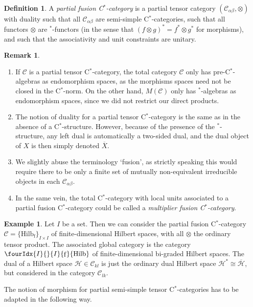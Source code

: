 \documentclass[11pt]{article}
\DeclareMathOperator{\fin}{\mathrm{f}}
\newcommand{\Hsp}{\mathcal{H}}
\newcommand{\CatC}{\mathcal{C}}
\newcommand{\CatCC}{\mathscr{C}}
\newcommand{\Hilb}{\mathrm{Hilb}}
\newcommand{\Hilbif}{\Gr{\mathrm{Hilb}}{I}{I}{}{\fin}}
\newcommand{\Gr}[5]{\fourIdx{#2}{#4}{#3}{#5}{#1}}%
\theoremstyle{definition}
\newtheorem{Def}[Theorem]{Definition}
\newtheorem{Rem}[Theorem]{Remark}
\newtheorem{Exa}[Theorem]{Example}
\numberwithin{equation}{section}
\begin{document}
\begin{Def} A \emph{partial fusion C$^*$-category} is a partial tensor category $(\CatC_{\alpha\beta},\otimes)$ with duality such that all $\CatC_{\alpha\beta}$ are semi-simple C$^*$-categories, such that all functors $\otimes$ are $^*$-functors (in the sense that $(f\otimes g)^* = f^*\otimes g^*$ for morphisms), and such that the associativity and unit constraints are unitary.
\end{Def} 

\begin{Rem}
\begin{enumerate}
\item If $\CatCC$ is a partial tensor C$^*$-category, the total category $\CatC$ only has pre-C$^*$-algebras as endomorphism spaces, as the morphisms spaces need not be closed in the C$^*$-norm. On the other hand, $M(\CatC)$ only has $^*$-algebras as endomorphism spaces, since we did not restrict our direct products. 
\item The notion of duality for a partial tensor C$^*$-category is the same as in the absence of a C$^*$-structure. However, because of the presence of the $^*$-structure, any left dual is automatically a two-sided dual, and the dual object of $X$ is then simply denoted $\overline{X}$.  
\item We slightly abuse the terminology `fusion', as strictly speaking this would require there to be only a finite set of mutually non-equivalent irreducible objects in each $\CatC_{\alpha\beta}$.
\item In the same vein, the total C$^*$-category with local units associated to a partial fusion C$^*$-category could be called a \emph{multiplier fusion C$^*$-category}.
\end{enumerate}
\end{Rem}

\begin{Exa} Let $I$ be a set. Then we can consider the partial fusion C$^*$-category $\CatCC = \{\Hilb_{\fin}\}_{I\times I}$ of finite-dimensional Hilbert spaces, with all $\otimes$ the ordinary tensor product. The associated global category is the category $\Hilbif$ of finite-dimensional bi-graded Hilbert spaces. The dual of a Hilbert space $\Hsp \in \CatC_{kl}$ is just the ordinary dual Hilbert space $\Hsp^* \cong \overline{\Hsp}$, but considered in the category $\CatC_{lk}$. 
\end{Exa}

The notion of morphism for partial semi-simple tensor C$^*$-categories has to be adapted in the following way.
\end{document}
